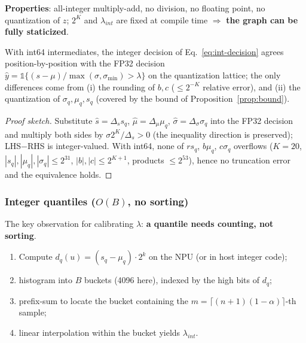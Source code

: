 \textbf{Properties}: all-integer multiply-add, no division, no floating point, no quantization of $z$; $2^{K}$ and $\lambda_{int}$ are fixed at compile time $\Rightarrow$ \textbf{the graph can be fully staticized}.

\begin{lemma}
\label{lem:equivalence}
With int64 intermediates, the integer decision of Eq.~\eqref{eq:int-decision} agrees position-by-position with the FP32 decision $\hat y=\mathbb{1}\{(s-\mu)/\max(\sigma,\sigma_{\min})>\lambda\}$ on the quantization lattice; the only differences come from (i) the rounding of $b,c$ ($\le 2^{-K}$ relative error), and (ii) the quantization of $\sigma_q,\mu_q,s_q$ (covered by the bound of Proposition~\ref{prop:bound}).
\end{lemma}

\begin{proof}[Proof sketch]
Substitute $\hat s=\Delta_s s_q$, $\hat\mu=\Delta_\mu\mu_q$, $\hat\sigma=\Delta_\sigma\sigma_q$ into the FP32 decision and multiply both sides by $\sigma 2^K/\Delta_s>0$ (the inequality direction is preserved); LHS$-$RHS is integer-valued.
With int64, none of $r s_q$, $b\mu_q$, $c\sigma_q$ overflows ($K=20$, $|s_q|,|\mu_q|,|\sigma_q|\le 2^{31}$, $|b|,|c|\le 2^{K+1}$, products $\le 2^{53}$), hence no truncation error and the equivalence holds.
\end{proof}

\subsubsection{Integer quantiles ($O(B)$, no sorting)}
\label{sec:int-quantile}

The key observation for calibrating $\lambda$: \textbf{a quantile needs counting, not sorting}.
\begin{enumerate}
\item Compute $d_q(u)=(s_q-\mu_q)\cdot 2^{k}$ on the NPU (or in host integer code);
\item histogram into $B$ buckets (4096 here), indexed by the high bits of $d_q$;
\item prefix-sum to locate the bucket containing the $m=\lceil(n+1)(1-\alpha)\rceil$-th sample;
\item linear interpolation within the bucket yields $\lambda_{int}$.
\end{enumerate}

